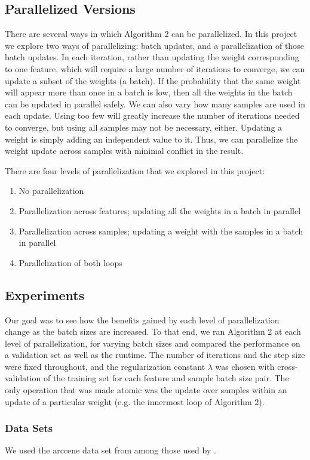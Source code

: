 \documentclass{article}
\begin{document}
\subsection{Parallelized Versions}
There are several ways in which Algorithm 2 can be parallelized. In this project we explore two ways of parallelizing: batch updates, and a parallelization of those batch updates.  In each iteration, rather than updating the weight corresponding to one feature, which will require a large number of iterations to converge, we can update a subset of the weights (a batch).  If the probability that the same weight will appear more than once in a batch is low, then all the weights in the batch can be updated in parallel safely. We can also vary how many samples are used in each update.  Using too few will greatly increase the number of iterations needed to converge, but using all samples may not be necessary, either.  Updating a weight is simply adding an independent value to it.  Thus, we can parallelize the weight update across samples with minimal conflict in the result.

There are four levels of parallelization that we explored in this project:
\begin{enumerate}
\item
No parallelization
\item
Parallelization across features; updating all the weights in a batch in parallel
\item
Parallelization across samples; updating a weight with the samples in a batch in parallel
\item
Parallelization of both loops
\end{enumerate}
\subsection{Experiments}
Our goal was to see how the benefits gained by each level of parallelization change as the batch sizes are increased.  To that end, we ran Algorithm 2 at each level of parallelization, for varying batch sizes and compared the performance on a validation set as well as the runtime. The number of iterations and the step size were fixed throughout, and the regularization constant $\lambda$ was chosen with cross-validation of the training set for each feature and sample batch size pair. The only operation that was made atomic was the update over samples within an update of a particular weight (e.g. the innermost loop of Algorithm 2).
\subsubsection{Data Sets}
We used the arccene data set from among those used by \cite{shotgun2011}.
\end{document}
